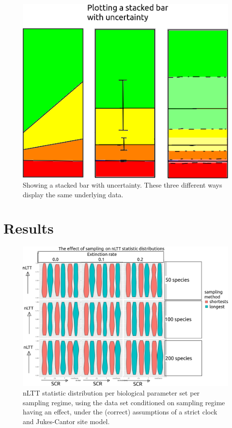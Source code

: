 \begin{figure}[!htbp]
  \includegraphics[width=\textwidth]{fig_stacked_bar_with_uncertainty.png}
  \caption{
    Showing a stacked bar with uncertainty. These three different ways
    display the same underlying data.
  }
\end{figure}


\section{Results}

\begin{figure}[!htbp]
  \includegraphics[width=\textwidth]{fig_sampling.png}
  \caption{
    nLTT statistic distribution per biological parameter set per sampling
    regime, using the data set conditioned on sampling regime having an effect, 
    under the (correct) assumptions of a strict clock and Jukes-Cantor site model.
  }
\end{figure}

